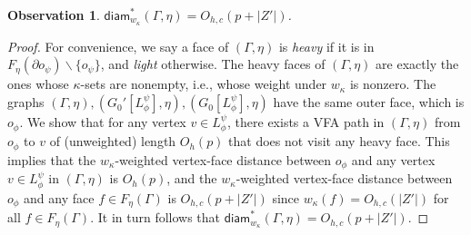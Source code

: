 \documentclass[a4paper,11pt]{article}
\numberwithin{lemma}{section}
\newtheorem{observation}[lemma]{Observation}
\begin{document}
\begin{observation}
$\mathsf{diam}_{w_\kappa}^*(\varGamma,\eta) = O_{h,c}(p+|Z'|)$.
\end{observation}
\begin{proof}
For convenience, we say a face of $(\varGamma,\eta)$ is \emph{heavy} if it is in $F_\eta(\partial o_\psi) \backslash \{o_\psi\}$, and \emph{light} otherwise.
The heavy faces of $(\varGamma,\eta)$ are exactly the ones whose $\kappa$-sets are nonempty, i.e., whose weight under $w_\kappa$ is nonzero.
The graphs $(\varGamma,\eta),(G_0'[L_\phi^\psi],\eta),(G_0[L_\phi^\psi],\eta)$ have the same outer face, which is $o_{\phi}$.
We show that for any vertex $v \in L_\phi^\psi$, there exists a VFA path in $(\varGamma,\eta)$ from $o_\phi$ to $v$ of (unweighted) length $O_h(p)$ that does not visit any heavy face.
This implies that the $w_\kappa$-weighted vertex-face distance between $o_\phi$ and any vertex $v \in L_\phi^\psi$ in $(\varGamma,\eta)$ is $O_h(p)$, and the $w_\kappa$-weighted vertex-face distance between $o_\phi$ and any face $f \in F_\eta(\varGamma)$ is $O_{h,c}(p+|Z'|)$ since $w_\kappa(f) = O_{h,c}(|Z'|)$ for all $f \in F_\eta(\varGamma)$.
It in turn follows that $\mathsf{diam}_{w_\kappa}^*(\varGamma,\eta) = O_{h,c}(p+|Z'|)$.


\end{proof}
\end{document}
